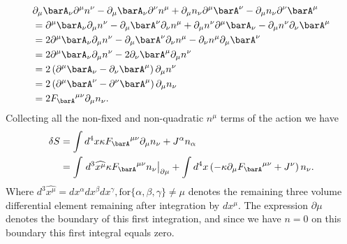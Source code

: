 \begin{equation}\label{eqn:lagrangianFieldDensity:260}
\begin{aligned}
&  \partial_{\mu} \barA_{\nu} \partial^{\mu} n^{\nu}
-  \partial_{\mu} \barA_{\nu} \partial^{\nu} n^{\mu}
+  \partial_{\mu} n_{\nu} \partial^{\mu} \barA^{\nu}
-  \partial_{\mu} n_{\nu} \partial^{\nu} \barA^{\mu} \\
&=  \partial^{\mu} \barA_{\nu} \partial_{\mu} n^{\nu}
-  \partial_{\mu} \barA^{\nu} \partial_{\nu} n^{\mu}
+  \partial_{\mu} n^{\nu} \partial^{\mu} \barA_{\nu}
-  \partial_{\mu} n^{\nu} \partial_{\nu} \barA^{\mu} \\
&= 2  \partial^{\mu} \barA_{\nu} \partial_{\mu} n^{\nu}
-  \partial_{\mu} \barA^{\nu} \partial_{\nu} n^{\mu}
-  \partial_{\nu} n^{\mu} \partial_{\mu} \barA^{\nu} \\
&= 2  \partial^{\mu} \barA_{\nu} \partial_{\mu} n^{\nu}
- 2  \partial_{\nu} \barA^{\mu} \partial_{\mu} n^{\nu} \\
&= 2  \left( \partial^{\mu} \barA_{\nu} -\partial_{\nu} \barA^{\mu} \right) \partial_{\mu} n^{\nu} \\
&= 2  \left( \partial^{\mu} \barA^{\nu} -\partial^{\nu} \barA^{\mu} \right) \partial_{\mu} n_{\nu} \\
&= 2  {F_{\barA}}^{\mu\nu} \partial_{\mu} n_{\nu} .
\end{aligned}
\end{equation}
%
Collecting all the non-fixed and non-quadratic \(n^{\mu}\) terms of the action we have
%
\begin{equation}\label{eqn:lagrangianFieldDensity:280}
\begin{aligned}
\delta S
&= \int d^4 x \kappa {F_{\barA}}^{\mu\nu} \partial_{\mu} n_{\nu} + J^{\alpha} n_{\alpha} \\
&= \int \left. d^3 \widehat{x^{\mu}} \kappa {F_{\barA}}^{\mu\nu} n_{\nu} \right\vert_{\partial \mu}
 + \int d^4 x \left(
- \kappa \partial_{\mu} {F_{\barA}}^{\mu\nu} + J^{\nu}
\right) n_{\nu} .
\end{aligned}
\end{equation}
%
Where \(d^3 \widehat{x^{\mu}} = dx^\alpha dx^\beta dx^\gamma, \text{for} \{\alpha, \beta, \gamma\} \ne \mu\) denotes the remaining three volume differential element remaining after integration by \(dx^{\mu}\).  The expression \(\partial \mu\) denotes the boundary of this first integration, and since we have \(n=0\) on this boundary this first integral equals zero.


